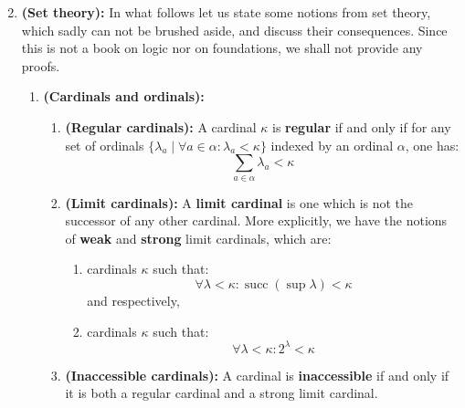 \begin{enumerate}
\begin{enumerate}
\begin{enumerate}
$$                            $$
                    \end{enumerate}
            \end{enumerate}
        \item \textbf{(Set theory):} In what follows let us state some notions from set theory, which sadly can not be brushed aside, and discuss their consequences. Since this is not a book on logic nor on foundations, we shall not provide any proofs.
            \begin{enumerate}
                \item \textbf{(Cardinals and ordinals):}
                    \begin{definition} \label{def: limit_cardinal}
                        \noindent
                        \begin{enumerate}
                            \item \textbf{(Regular cardinals):} A cardinal $\kappa$ is \textbf{regular} if and only if for any set of ordinals $\{\lambda_a \mid \forall a \in \alpha: \lambda_a < \kappa\}$ indexed by an ordinal $\alpha$, one has:
                            $$\sum_{a \in \alpha} \lambda_a < \kappa$$ 
                            \item \textbf{(Limit cardinals):} A \textbf{limit cardinal} is one which is not the successor of any other cardinal. More explicitly, we have the notions of \textbf{weak} and \textbf{strong} limit cardinals, which are:
                                \begin{enumerate}
                                    \item cardinals $\kappa$ such that:
                                        $$\forall \lambda < \kappa: \operatorname{succ} (\sup \lambda) < \kappa$$
                                    and respectively,
                                    \item cardinals $\kappa$ such that:
                                        $$\forall \lambda < \kappa: 2^{\lambda} < \kappa$$
                                \end{enumerate}
                            \item \textbf{(Inaccessible cardinals):} A cardinal is \textbf{inaccessible} if and only if it is both a regular cardinal and a strong limit cardinal.
                        \end{enumerate}
                    \end{definition}
                    \begin{example}

\end{example}
\end{enumerate}
\end{enumerate}
